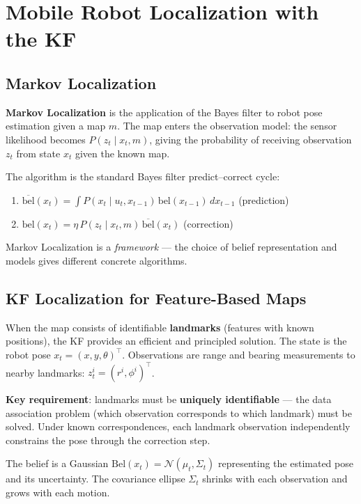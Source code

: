 \documentclass[11pt,a4paper]{article}
\theoremstyle{definition}
\theoremstyle{plain}
\theoremstyle{remark}
\begin{document}
\section{Mobile Robot Localization with the KF}

\subsection{Markov Localization}

\textbf{Markov Localization} is the application of the Bayes filter to robot pose estimation given a map $m$. The map enters the observation model: the sensor likelihood becomes $P(z_t \mid x_t, m)$, giving the probability of receiving observation $z_t$ from state $x_t$ given the known map.

The algorithm is the standard Bayes filter predict--correct cycle:
\begin{enumerate}
    \item $\overline{\mathrm{bel}}(x_t) = \int P(x_t \mid u_t, x_{t-1})\,\mathrm{bel}(x_{t-1})\,dx_{t-1}$ \quad (prediction)
    \item $\mathrm{bel}(x_t) = \eta\, P(z_t \mid x_t, m)\,\overline{\mathrm{bel}}(x_t)$ \quad (correction)
\end{enumerate}

Markov Localization is a \textit{framework} — the choice of belief representation and models gives different concrete algorithms.

\subsection{KF Localization for Feature-Based Maps}

When the map consists of identifiable \textbf{landmarks} (features with known positions), the KF provides an efficient and principled solution. The state is the robot pose $x_t = (x, y, \theta)^\top$. Observations are range and bearing measurements to nearby landmarks: $z_t^i = (r^i, \phi^i)^\top$.

\textbf{Key requirement}: landmarks must be \textbf{uniquely identifiable} — the data association problem (which observation corresponds to which landmark) must be solved. Under known correspondences, each landmark observation independently constrains the pose through the correction step.

The belief is a Gaussian $\mathrm{Bel}(x_t) = \mathcal{N}(\mu_t, \Sigma_t)$ representing the estimated pose and its uncertainty. The covariance ellipse $\Sigma_t$ shrinks with each observation and grows with each motion.
\end{document}
